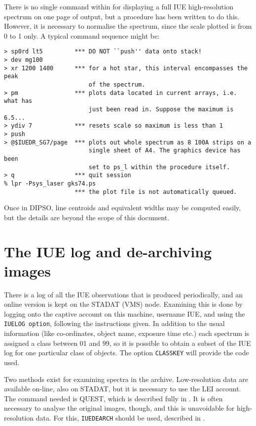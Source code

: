 There is no single command within  for displaying a
full IUE
high-resolution spectrum on one page of output, but a procedure has been
written to do this.  However, it is necessary to normalise the spectrum,
since the scale plotted is from 0 to 1 only. A typical command sequence
might be:

\begin{verbatim}
> sp0rd lt5         *** DO NOT ``push'' data onto stack!
> dev mg100
> xr 1200 1400      *** for a hot star, this interval encompasses the peak
                        of the spectrum.
> pm                *** plots data located in current arrays, i.e. what has
                        just been read in. Suppose the maximum is 6.5...
> ydiv 7            *** resets scale so maximum is less than 1
> push
> @$IUEDR_SG7/page  *** plots out whole spectrum as 8 100A strips on a
                        single sheet of A4. The graphics device has been
                        set to ps_l within the procedure itself.
> q                 *** quit session
% lpr -Psys_laser gks74.ps
                    *** the plot file is not automatically queued.
\end{verbatim}

Once in DIPSO, line centroids and equivalent widths may be computed
easily, but the details are beyond the scope of this document.

\section{The IUE log and de-archiving images}

There is a log of all the IUE observations that is produced periodically, and
an online version is kept on the STADAT (VMS) node.  Examining this is done by
logging onto the captive account on this machine, username IUE, and using the
{\tt IUELOG option}, following the instructions given.  In addition to
the usual information (like co-ordinates, object name, exposure time etc.)
each spectrum is assigned a class between 01 and 99, so it is possible to
obtain a subset of the IUE log for one particular class of objects. The
option {\tt CLASSKEY} will provide the code used.

Two methods exist for examining spectra in the archive.  Low-resolution data
are available on-line, also on STADAT, but it is necessary to use the LEI
account.  The command needed is QUEST, which is described fully in
.  It is often necessary to analyse the original
images, though,
and this is unavoidable for high-resolution data.  For this, {\tt IUEDEARCH}
should be used, described in .

